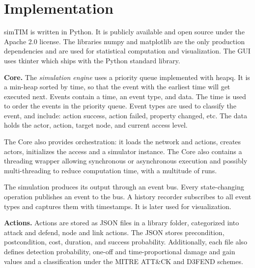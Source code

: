 \documentclass{llncs}
\begin{document}
\section{Implementation}


simTIM is written in Python. It is publicly available and open source under the Apache 2.0 license. The libraries numpy and matplotlib are the only production dependencies and are used for statistical computation and visualization. The GUI uses tkinter which ships with the Python standard library.

\textbf{Core.}
The \emph{simulation engine} uses a priority queue implemented with heapq. It is a min-heap sorted by time, so that the event with the earliest time will get executed next. %
Events contain a time, an event type, and data.
The time is used to order the events in the priority queue. Event types are used to classify the event, and include: action success, action failed, property changed, etc. The data holds the actor, action, target node, and current access level.

The Core also provides orchestration: it loads the network and actions, creates actors, initializes the access and a simulator instance.
The Core also contains a threading wrapper allowing synchronous or asynchronous execution and possibly multi-threading to reduce computation time, with a multitude of runs.

The simulation produces its output through an event bus. Every state-changing operation publishes an event to the bus. A history recorder subscribes to all event types and captures them with timestamps. It is later used for visualization.


\textbf{Actions.}
Actions are stored as JSON files in a library folder, categorized into attack and defend, node and link actions.
The JSON stores precondition, postcondition, cost, duration, and success probability.
Additionally, each file also defines detection probability, one-off and time-proportional damage and gain values and a classification under the MITRE ATT\&CK and D3FEND schemes.
\end{document}
